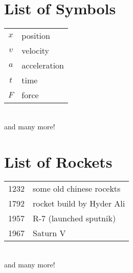 \chapter*{List of Symbols}

\begin{tabular}{cp{}}
  $x$ & position \\
  $v$ & velocity \\
  $a$ & acceleration \\
  $t$ & time \\
  $F$ & force
\end{tabular}\\
and many more!

\chapter*{List of Rockets}

\begin{tabular}{cp{}}
  1232 & some old chinese rocekts \\
  1792 & rocket build by Hyder Ali \\
  1957 & R-7 (launched sputnik) \\
  1967 & Saturn V
\end{tabular}\\
and many more!


